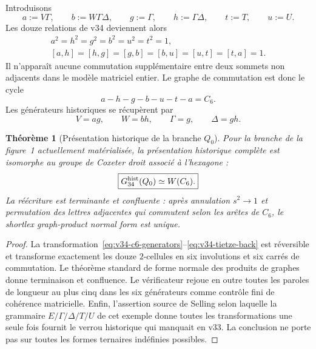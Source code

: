 \documentclass[11pt,a4paper]{article}
\newtheorem{theorem}{Théorème}[section]
\begin{document}
Introduisons
\begin{equation}\label{eq:v34-c6-generators}
 a:=V\Gamma,
 \qquad
 b:=W\Gamma\Delta,
 \qquad
 g:=\Gamma,
 \qquad
 h:=\Gamma\Delta,
 \qquad
 t:=T,
 \qquad
 u:=U.
\end{equation}
Les douze relations de v34 deviennent alors
\begin{equation}\label{eq:v34-c6-presentation}
 \boxed{
 \begin{gathered}
 a^2=h^2=g^2=b^2=u^2=t^2=1,\\
 [a,h]=[h,g]=[g,b]=[b,u]=[u,t]=[t,a]=1.
 \end{gathered}}
\end{equation}
Il n'apparaît aucune commutation supplémentaire entre deux sommets non adjacents dans le modèle
matriciel entier. Le graphe de commutation est donc le cycle
\[
 \boxed{a-h-g-b-u-t-a=C_6.}
\]
Les générateurs historiques se récupèrent par
\begin{equation}\label{eq:v34-tietze-back}
 V=ag,
 \qquad
 W=bh,
 \qquad
 \Gamma=g,
 \qquad
 \Delta=gh.
\end{equation}

\begin{theorem}[Présentation historique de la branche $Q_0$]\label{thm:v34-racg-c6}
Pour la branche de la figure~1 actuellement matérialisée, la présentation historique complète est
isomorphe au groupe de Coxeter droit associé à l'hexagone :
\begin{equation}\label{eq:v34-racg}
 \boxed{
 G_{34}^{\rm hist}(Q_0)
 \simeq
 W(C_6).}
\end{equation}
La réécriture est terminante et confluente : après annulation $s^2\to1$ et permutation des lettres
adjacentes qui commutent selon les arêtes de $C_6$, le shortlex graph-product normal form est unique.
\end{theorem}

\begin{proof}
La transformation~\eqref{eq:v34-c6-generators}--\eqref{eq:v34-tietze-back} est réversible et
transforme exactement les douze $2$-cellules en six involutions et six carrés de commutation.
Le théorème standard de forme normale des produits de graphes donne terminaison et confluence.
Le vérificateur rejoue en outre toutes les paroles de longueur au plus cinq dans les six générateurs
comme contrôle fini de cohérence matricielle. Enfin, l'assertion source de Selling selon laquelle la
grammaire $E/\Gamma/\Delta/T/U$ de cet exemple donne toutes les transformations une seule fois
fournit le verrou historique qui manquait en v33. La conclusion ne porte pas sur toutes les formes
ternaires indéfinies possibles.
\end{proof}
\end{document}
